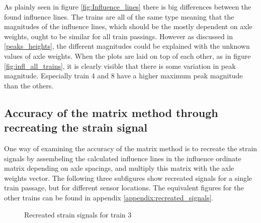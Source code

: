 As plainly seen in figure \ref{fig:Influence_lines} there is big differences between the found influence lines. The trains are all of the same type meaning that the magnitudes of the influence lines, which should be the mostly dependent on axle weights, ought to be similar for all train passings. However as discussed in \ref{peaks_heights}, the different magnitudes could be explained with the unknown values of axle weights. When the plots are laid on top of each other, as in figure \ref{fig:infl_all_trains}, it is clearly visible that there is some variation in peak magnitude. Especially train 4 and 8 have a higher maximum peak magnitude than the others.

\subsection{Accuracy of the matrix method through recreating the strain signal}
One way of examining the accuracy of the matrix method is to recreate the strain signals by assembeling the calculated influence lines in the influence ordinate matrix depending on axle spacings, and multiply this matrix with the axle weights vector. The following three subfigures show recreated signals for a single train passage, but for different sensor locations. The equivalent figures for the other trains can be found in appendix \ref{appendix:recreated_signals}.
\begin{figure}[H]
	\begin{subfigure}[t]{0.9\textwidth}
			
		\label{recreated_sensor_trond_train3}
	\end{subfigure}

	\begin{subfigure}[t]{0.9\textwidth}
			
		\label{recreated_sensor_middle_train3}
	\end{subfigure}

	\begin{subfigure}[t]{0.9\textwidth}
			
		\label{recreated_sensor_heimdal_train3}
	\end{subfigure}
	\caption{Recreated strain signals for train 3}
	\label{fig:recreated_strains}
\end{figure}
